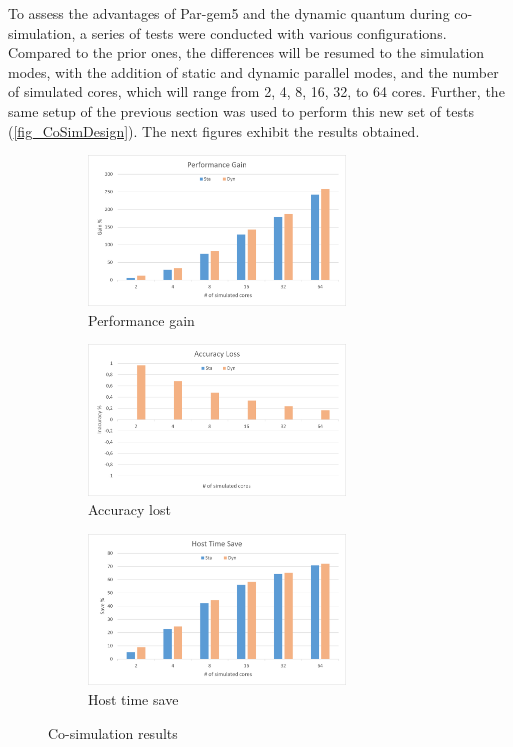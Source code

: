 To assess the advantages of Par-gem5 and the dynamic quantum during co-simulation, a series of tests were conducted with various configurations. 
Compared to the prior ones, the differences will be resumed to the simulation modes, with the addition of static and dynamic parallel modes, 
and the number of simulated cores, which will range from 2, 4, 8, 16, 32, to 64 cores. Further, the same setup of the previous section was used  
to perform this new set of tests (\autoref{fig_CoSimDesign}). The next figures exhibit the results obtained. 


\begin{figure}[]
	\centering
	\begin{subfigure}{\textwidth}
		\centering
		\includegraphics[width=0.75\textwidth]{Images/Performance_CO_SIM.png}
		\caption{ Performance gain}
	\end{subfigure}
	\begin{subfigure}{\textwidth}
		\centering
		\includegraphics[width=0.75\textwidth]{Images/Accuracy_CO_SIM.png}
		\caption{ Accuracy lost}
	\end{subfigure}
	\begin{subfigure}{\textwidth}
		\centering
		\includegraphics[width=0.75\textwidth]{Images/Host_CO_SIM.png}
		\caption{ Host time save}
	\end{subfigure}
			
	\caption{Co-simulation results}
\end{figure}


